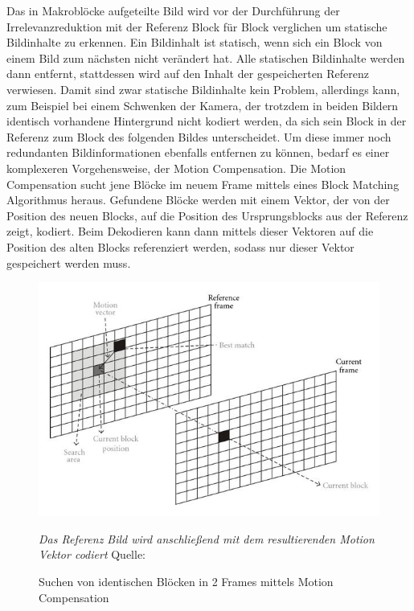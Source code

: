 Das in Makroblöcke aufgeteilte Bild wird vor der Durchführung der Irrelevanzreduktion mit der Referenz Block für Block verglichen um statische Bildinhalte zu 
erkennen. \cite{symes_peter_digital_2004} Ein Bildinhalt ist statisch, wenn sich ein Block von einem Bild zum nächsten nicht verändert hat. Alle statischen Bildinhalte werden dann entfernt, stattdessen wird auf den Inhalt der gespeicherten Referenz verwiesen. 
Damit sind zwar statische Bildinhalte kein Problem, allerdings kann, zum Beispiel bei einem Schwenken der Kamera, der trotzdem in beiden Bildern identisch vorhandene Hintergrund nicht kodiert werden, da sich sein Block in der Referenz zum Block des folgenden Bildes unterscheidet. Um diese immer noch redundanten Bildinformationen ebenfalls entfernen zu können, bedarf es einer komplexeren Vorgehensweise, der Motion Compensation.
Die Motion Compensation sucht jene Blöcke im neuem Frame mittels eines Block Matching Algorithmus heraus. Gefundene Blöcke werden mit einem Vektor, der von der Position des neuen Blocks, auf die Position des Ursprungsblocks aus der Referenz zeigt, kodiert.\cite{symes_peter_digital_2004} Beim Dekodieren kann dann mittels dieser Vektoren auf die Position des alten Blocks referenziert werden, sodass nur dieser Vektor gespeichert werden muss.
\begin{figure}[h!]
    \centering
    \includegraphics[scale=3]{images/3-2-3_motionCompensation.jpg}
    \caption{Suchen von identischen Blöcken in 2 Frames mittels Motion Compensation}
    \textit{Das Referenz Bild wird anschließend mit dem resultierenden Motion Vektor codiert}
    Quelle: \cite{lopes_memory_2012}
\end{figure}



